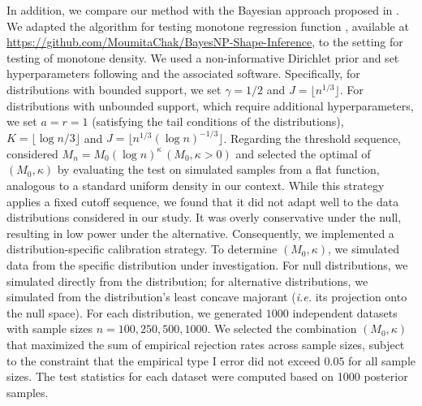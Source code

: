 \documentclass[12pt,letterpaper, twoside, openany]{article}
\theoremstyle{plain}
\begin{document}
{In addition, we compare our method with the Bayesian approach proposed in \cite{chakraborty2022rates}. We adapted the algorithm for testing monotone regression function \citep{chakraborty2021convergence}, available at \url{https://github.com/MoumitaChak/BayesNP-Shape-Inference},  to the setting for testing of monotone density. We used a non-informative Dirichlet prior and set hyperparameters following \cite{chakraborty2021convergence} and the associated software.  Specifically, for distributions with bounded support, we set $\gamma = 1/2$ and $J = \lfloor n^{1/3} \rfloor$.  For distributions with unbounded support, which require additional hyperparameters,  we set $a=r=1$ (satisfying the tail conditions of the distributions), $K = \lfloor \log n / 3 \rfloor$ and $J=\lfloor n^{1/3} (\log n)^{-1/3} \rfloor$. 
Regarding the threshold sequence, \cite{chakraborty2021convergence} considered $M_n = M_0 (\log n)^{\kappa}\, (M_0, \kappa > 0)$ and selected the optimal  of $(M_0,\kappa)$ by evaluating the test on simulated samples from a flat function, analogous to a standard uniform density in our context. While this strategy applies a fixed cutoff sequence, we found that it did not adapt well to the data distributions considered in our study.  It was overly conservative under the null, resulting in low power under the alternative.  Consequently, we implemented a distribution-specific calibration strategy. To determine $(M_0,\kappa)$, we simulated data from the specific distribution under investigation. For null distributions, we simulated directly from the distribution; for alternative distributions, we simulated from the distribution’s least concave majorant (\emph{i.e.} its projection onto the null space). {For each distribution, we generated $1000$ independent datasets with sample sizes $n=100,250,500,1000$.  We selected the combination  $(M_0,\kappa)$ that maximized the sum of empirical rejection rates across sample sizes, subject to the constraint that the empirical type I error did not exceed 
$0.05$ for all sample sizes.} The test statistics for each dataset were computed based on 
1000 posterior samples.



}
\end{document}
